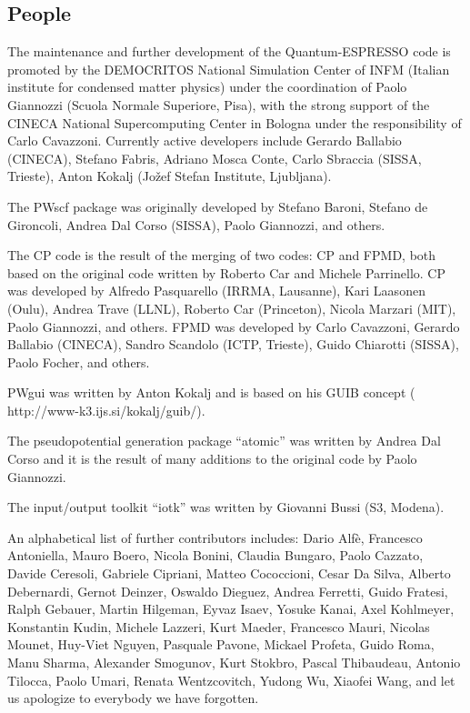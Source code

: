 \documentclass[12pt,a4paper]{article}
\begin{document}
\subsection{People}

The maintenance and further development of the Quantum-ESPRESSO code is
promoted by the DEMOCRITOS National Simulation Center of INFM (Italian
institute for condensed matter physics) under the coordination of
Paolo Giannozzi (Scuola Normale Superiore, Pisa), with the strong
support of the CINECA National Supercomputing Center in Bologna under
the responsibility of Carlo Cavazzoni.
Currently active developers include
Gerardo Ballabio (CINECA),
Stefano Fabris,
Adriano Mosca Conte,
Carlo Sbraccia (SISSA, Trieste),
Anton Kokalj (Jo\v{z}ef Stefan Institute, Ljubljana).

The PWscf package was originally developed by Stefano Baroni, Stefano
de Gironcoli, Andrea Dal Corso (SISSA), Paolo Giannozzi, and others.

The CP code is the result of the merging of two codes: CP and FPMD,
both based on the original code written by Roberto Car and Michele
Parrinello.
CP was developed by
Alfredo Pasquarello (IRRMA, Lausanne),
Kari Laasonen (Oulu),
Andrea Trave (LLNL),
Roberto Car (Princeton),
Nicola Marzari (MIT),
Paolo Giannozzi,
and others.
FPMD was developed by
Carlo Cavazzoni,
Gerardo Ballabio (CINECA),
Sandro Scandolo (ICTP, Trieste),
Guido Chiarotti (SISSA),
Paolo Focher,
and others.

PWgui was written by Anton Kokalj and is based on his GUIB concept
(%
                   {http://www-k3.ijs.si/kokalj/guib/}).

The pseudopotential generation package ``atomic'' was written by
Andrea Dal Corso and it is the result of many additions to the
original code by Paolo Giannozzi.

The input/output toolkit ``iotk'' was written by Giovanni Bussi (S3,
Modena).

An alphabetical list of further contributors includes:
Dario Alf\`e,
Francesco Antoniella,
Mauro Boero,
Nicola Bonini,
Claudia Bungaro,
Paolo Cazzato,
Davide Ceresoli,
Gabriele Cipriani,
Matteo Cococcioni,
Cesar Da Silva, 
Alberto Debernardi,
Gernot Deinzer,
Oswaldo Dieguez,
Andrea Ferretti, 
Guido Fratesi,
Ralph Gebauer,
Martin Hilgeman,
Eyvaz Isaev, 
Yosuke Kanai,
Axel Kohlmeyer,
Konstantin Kudin,
Michele Lazzeri,
Kurt Maeder,
Francesco Mauri,
Nicolas Mounet,
Huy-Viet Nguyen,
Pasquale Pavone,
Mickael Profeta,
Guido Roma,
Manu Sharma,
Alexander Smogunov,
Kurt Stokbro,
Pascal Thibaudeau,
Antonio Tilocca,
Paolo Umari,
Renata Wentzcovitch,
Yudong Wu,
Xiaofei Wang,
and let us apologize to everybody we have forgotten.
\end{document}
